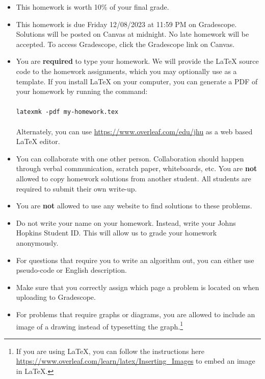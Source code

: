 \documentclass[letter,11pt]{article}
\begin{document}
\begin{itemize}
\item This homework is worth 10\% of your final grade.

\item This homework is due Friday 12/08/2023 at 11:59 PM on Gradescope.  Solutions will be posted on Canvas at midnight.  No late homework will be accepted.  To access Gradescope, click the Gradescope link on Canvas.

\item You are \textbf{required} to type your homework.  We will
  provide the \LaTeX{} source code to the homework assignments, which you may
  optionally use as a template.  If you install \LaTeX{} on your computer, you can
  generate a PDF of
  your homework by running the command: \\
  \\
  \texttt{latexmk~-pdf~my-homework.tex} \\
  \\
  Alternately, you can use \url{https://www.overleaf.com/edu/jhu} as a web based
  \LaTeX{} editor.

\item You can collaborate with one other person.
    Collaboration should happen through verbal communication, scratch paper,
    whiteboards, etc.  You are \textbf{not} allowed to copy homework
    solutions from another student.  All students are required to submit their
    own write-up.

\item You are \textbf{not} allowed to use any website to find solutions to these problems.

\item Do not write your name on your homework. Instead, write your Johns Hopkins Student ID.  This will allow us to grade your homework anonymously.

\item For questions that require you to write an algorithm out, you can either use pseudo-code or English description.

\item Make sure that you correctly assign which page a problem is located on when uploading to Gradescope.

\item For problems that require graphs or diagrams, you are allowed to include an image of a drawing instead of typesetting the graph.\footnote{If you are using LaTeX, you can follow the instructions here \url{https://www.overleaf.com/learn/latex/Inserting_Images} to embed an image in LaTeX.}

\end{itemize}
\end{document}

